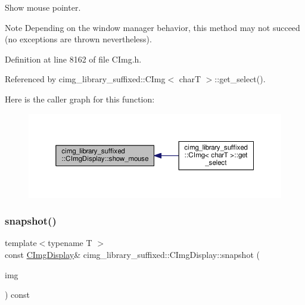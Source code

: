 Show mouse pointer. 

\begin{DoxyNote}{Note}
Depending on the window manager behavior, this method may not succeed (no exceptions are thrown nevertheless). 
\end{DoxyNote}


Definition at line 8162 of file C\+Img.\+h.



Referenced by cimg\+\_\+library\+\_\+suffixed\+::\+C\+Img$<$ char\+T $>$\+::get\+\_\+select().

Here is the caller graph for this function\+:
\nopagebreak
\begin{figure}[H]
\begin{center}
\leavevmode
\includegraphics[width=350pt]{d5/d53/structcimg__library__suffixed_1_1CImgDisplay_ac1d14f9181bff9e87ff95deb4ec752a5_icgraph}
\end{center}
\end{figure}
\mbox{\label{structcimg__library__suffixed_1_1CImgDisplay_a914ee0515249db301dc66275861a6b3e}} 
\subsubsection{\texorpdfstring{snapshot()}{snapshot()}}
{\footnotesize\ttfamily template$<$typename T $>$ \\
const \hyperlink{structcimg__library__suffixed_1_1CImgDisplay}{C\+Img\+Display}\& cimg\+\_\+library\+\_\+suffixed\+::\+C\+Img\+Display\+::snapshot (\begin{DoxyParamCaption}\item[{\hyperlink{structcimg__library__suffixed_1_1CImg}{C\+Img}$<$ T $>$ \&}]{img }\end{DoxyParamCaption}) const\hspace{0.3cm}{\ttfamily [inline]}}



